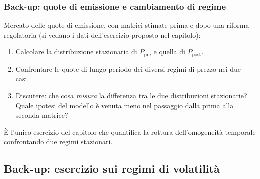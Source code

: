 \begin{frame}%
%

\frametitle{Back-up: quote di emissione e cambiamento di regime}%


Mercato delle quote di emissione, con matrici stimate prima e dopo una riforma
regolatoria (si vedano i dati dell'esercizio proposto nel capitolo):

\medskip

\begin{enumerate}
\item[1.] Calcolare la distribuzione stazionaria di $P_{\mathrm{pre}}$ e
quella di $P_{\mathrm{post}}$.

\item[2.] Confrontare le quote di lungo periodo dei diversi regimi di prezzo
nei due casi.

\item[3.] Discutere: che cosa \emph{misura} la differenza tra le due
distribuzioni stazionarie? Quale ipotesi del modello \`{e} venuta meno nel
passaggio dalla prima alla seconda matrice?
\end{enumerate}

\medskip

\begin{center}
{\small \`{E} l'unico esercizio del capitolo che quantifica la rottura
dell'omogeneit\`{a} temporale confrontando due regimi stazionari.}
\end{center}

%

\transboxout
\end{frame}%




\subsection{Back-up: esercizio sui regimi di volatilit\`{a}}%

